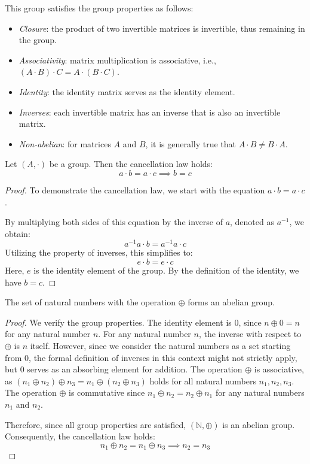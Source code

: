 \begin{example}
\begin{enumerate}
            This group satisfies the group properties as follows:
            \begin{itemize}
                \item \textit{Closure}: the product of two invertible matrices is invertible, thus remaining in the group.
                \item \textit{Associativity}: matrix multiplication is associative, i.e., $(A \cdot B) \cdot C = A \cdot (B \cdot C)$.
                \item \textit{Identity}: the identity matrix serves as the identity element.
                \item \textit{Inverses}: each invertible matrix has an inverse that is also an invertible matrix.
                \item \textit{Non-abelian}: for matrices $A$ and $B$, it is generally true that $A \cdot B \neq B \cdot A$.
            \end{itemize}
    \end{enumerate}
\end{example}
\begin{proposition}
    Let $(A, \cdot)$ be a group. 
    Then the cancellation law holds:
    \[a \cdot b = a \cdot c \implies b = c\]
\end{proposition}
\begin{proof}
    To demonstrate the cancellation law, we start with the equation $a\cdot b=a \cdot c$. 
    
    By multiplying both sides of this equation by the inverse of $a$, denoted as $a^{-1}$, we obtain: 
    \[a^{-1}a \cdot b = a^{-1} a \cdot c\] 
    Utilizing the property of inverses, this simplifies to:
    \[e \cdot b = e \cdot c\]
    Here, $e$ is the identity element of the group. 
    By the definition of the identity, we have $b = c$.
\end{proof}
\begin{proposition}
    The set of natural numbers with the operation $\oplus$ forms an abelian group.
\end{proposition}
\begin{proof}
    We verify the group properties.
    The identity element is $0$, since $n \oplus 0 = n$ for any natural number $n$.
    For any natural number $n$, the inverse with respect to $\oplus$ is $n$ itself. 
    However, since we consider the natural numbers as a set starting from $0$, the formal definition of inverses in this context might not strictly apply, but $0$ serves as an absorbing element for addition.
    The operation $\oplus$ is associative, as $(n_1 \oplus n_2) \oplus n_3 = n_1 \oplus (n_2 \oplus n_3)$ holds for all natural numbers $n_1, n_2, n_3$.
    The operation $\oplus$ is commutative since $n_1 \oplus n_2 = n_2 \oplus n_1$ for any natural numbers $n_1$ and $n_2$.

    Therefore, since all group properties are satisfied, $(\mathbb{N}, \oplus)$ is an abelian group. 
    Consequently, the cancellation law holds: 
    \[n_1 \oplus n_2 = n_1 \oplus n_3 \implies n_2 = n_3\]
\end{proof}